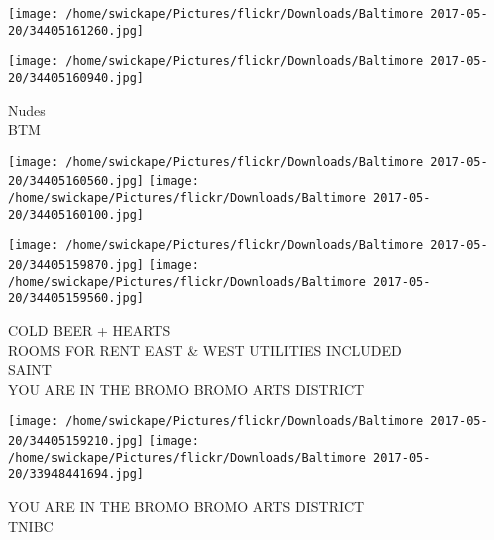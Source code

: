 \documentclass[10pt,letterpaper]{article}
\begin{document}
\texttt{[image: /home/swickape/Pictures/flickr/Downloads/Baltimore 2017-05-20/34405161260.jpg]}

\vspace{0.25in}
\texttt{[image: /home/swickape/Pictures/flickr/Downloads/Baltimore 2017-05-20/34405160940.jpg]}

Nudes\\
BTM
\pagebreak

\texttt{[image: /home/swickape/Pictures/flickr/Downloads/Baltimore 2017-05-20/34405160560.jpg]}
\texttt{[image: /home/swickape/Pictures/flickr/Downloads/Baltimore 2017-05-20/34405160100.jpg]}

\texttt{[image: /home/swickape/Pictures/flickr/Downloads/Baltimore 2017-05-20/34405159870.jpg]}
\texttt{[image: /home/swickape/Pictures/flickr/Downloads/Baltimore 2017-05-20/34405159560.jpg]}

COLD BEER + HEARTS\\
ROOMS FOR RENT EAST \& WEST UTILITIES INCLUDED\\
SAINT\\
YOU ARE IN THE BROMO BROMO ARTS DISTRICT
\pagebreak

\texttt{[image: /home/swickape/Pictures/flickr/Downloads/Baltimore 2017-05-20/34405159210.jpg]}
\texttt{[image: /home/swickape/Pictures/flickr/Downloads/Baltimore 2017-05-20/33948441694.jpg]}

YOU ARE IN THE BROMO BROMO ARTS DISTRICT\\
TNIBC
\pagebreak
\end{document}
